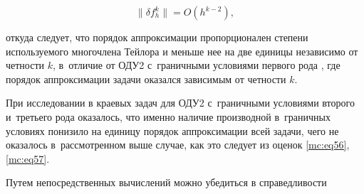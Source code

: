 \begin{equation}

\label{mc:eq58}

\|\delta f_h^k\| =O(h^{k-2}),

\end{equation}

откуда следует, что порядок аппроксимации пропорционален степени  используемого многочлена Тейлора и меньше нее на две единицы независимо от четности $k$, в~отличие от ОДУ2 с~граничными условиями первого рода \cite{mc:bib2}, где порядок аппроксимации задачи оказался зависимым от четности $k$.



При исследовании в \cite{mc:bib2} краевых задач для ОДУ2 с~граничными условиями второго и~третьего рода оказалось, что именно наличие производной в~граничных условиях понизило на единицу порядок аппроксимации всей задачи, чего не оказалось в~рассмотренном выше случае, как это следует из оценок \eqref{mc:eq56}, \eqref{mc:eq57}.%

















Путем непосредственных вычислений можно убедиться в справедливости

